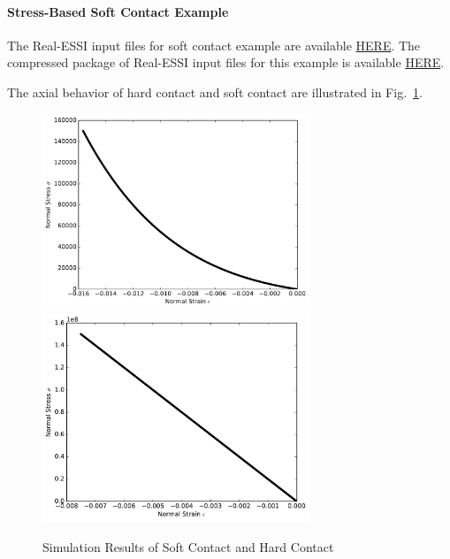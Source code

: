 \paragraph{Stress-Based Soft Contact Example}
The Real-ESSI input files for soft contact example are available 
\href{http://sokocalo.engr.ucdavis.edu/~jeremic/lecture_notes_online_material/_Chapter_Short_Course_Examples/Day3/Contact_Examples/axial/SoftContact_Elastic_Perfectly_Plastic_Shear_Model}{HERE}. 
The compressed package of Real-ESSI input files for this example is available 
\href{http://sokocalo.engr.ucdavis.edu/~jeremic/lecture_notes_online_material/_Chapter_Short_Course_Examples/Day3/Contact_Examples/axial/SoftContact_Elastic_Perfectly_Plastic_Shear_Model/_all_files_packaged_for_SoftContact_Elastic_Perfectly_Plastic_Shear_Model.tar.gz}{HERE}. 


The axial behavior of hard contact and soft contact are illustrated in Fig.~\ref{fig_soft_hard_contact}.



\begin{figure}[H]
  \centering
  \includegraphics[width = 8cm]{./Figure-files/Day3/Contact_Examples/softcontact.pdf}
  \includegraphics[width = 8cm]{./Figure-files/Day3/Contact_Examples/hardcontact.pdf}
  \caption{Simulation Results of Soft Contact and Hard Contact}
  \label{fig_soft_hard_contact}
\end{figure}






